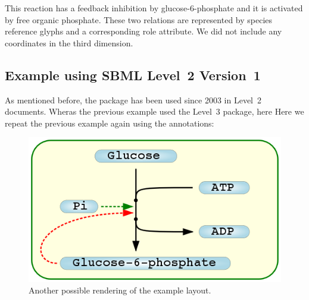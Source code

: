 This reaction has a feedback inhibition by glucose-6-phosphate and it is activated by free organic phosphate. These two relations are represented by species reference glyphs and a corresponding role attribute. We did not include any coordinates in the third 
dimension.



\subsection{Example using SBML Level~2 Version~1}
As mentioned before, the \Layout package has been used since 2003 in \SBML Level~2 documents. Wheras the previous example used the Level~3 package, here Here we repeat the previous example again using the \SBML annotations: 

\begin{center}
\begin{figure}[ht]
\includegraphics[scale=0.5]{figures/TestModel3-g++}
\caption{Another possible rendering of the example layout.}
\end{figure}
\end{center}

